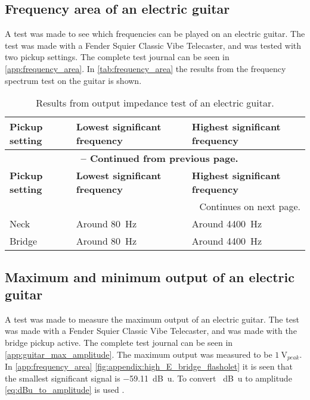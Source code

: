 \subsection{Frequency area of an electric guitar}
A test was made to see which frequencies can be played on an electric guitar. The test was made with a Fender Squier Classic Vibe Telecaster, and was tested with two pickup settings. The complete test journal can be seen in \autoref{app:frequency_area}. In \autoref{tab:frequency_area} the results from the frequency spectrum test on the guitar is shown.

\begin{longtable}[h!]{ |m{}| 
          m{}| 
          m{}|   } 
\caption{Results from output impedance test of an electric guitar.} \label{tab:frequency_area} \\ 
 
\hline 
\textbf{Pickup setting} & \textbf{Lowest significant frequency} & \textbf{Highest significant frequency} \\ 
\hline 
\endfirsthead     
\multicolumn{3}{c}{{{\footnotesize \bfseries \tablename\ \thetable{} -- Continued from previous page.}}} \\  
\hline 
\textbf{Pickup setting} & \textbf{Lowest significant frequency} & \textbf{Highest significant frequency} \\ 
\hline 
\endhead       
\hline \multicolumn{3}{|r|}{{Continues on next page.}} \\ \hline 
\endfoot     
\hline 
\endlastfoot 
Neck & Around \SI{80}{\hertz} & Around \SI{4400}{\hertz} \\ \hline
Bridge & Around \SI{80}{\hertz}  & Around \SI{4400}{\hertz}\\ \hline
\end{longtable}

\subsection{Maximum and minimum output of an electric guitar}
A test was made to measure the maximum output of an electric guitar. The test was made with a Fender Squier Classic Vibe Telecaster, and was made with the bridge pickup active. The complete test journal can be seen in \autoref{app:guitar_max_amplitude}. The maximum output was measured to be $\SI{1}{\volt}_{peak}$.
In \autoref{app:frequency_area} \autoref{fig:appendix:high_E_bridge_flasholet} it is seen that the smallest significant signal is \SI{-59.11}{\deci \bel u}. To convert \SI{}{\deci \bel u} to amplitude \autoref{eq:dBu_to_amplitude} is used \citep{dB}.

